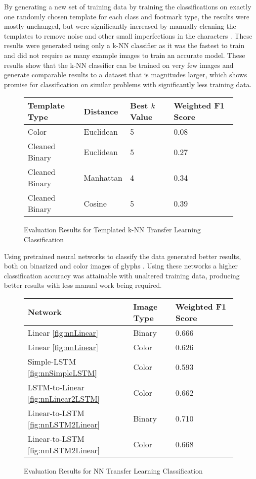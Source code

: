 By generating a new set of training data by training the classifications on exactly one randomly chosen template for each class and footmark type, the results were mostly unchanged, but were significantly increased by manually cleaning the templates to remove noise and other small imperfections in the characters . These results were generated using only a k-NN classifier as it was the fastest to train and did not require as many example images to train an accurate model. These results show that the k-NN classifier can be trained on very few images and generate comparable results to a dataset that is magnitudes larger, which shows promise for classification on similar problems with significantly less training data.

\begin{figure}[H]
    \caption{Evaluation Results for Templated k-NN Transfer Learning Classification}
    \label{fig:classificationKNNTemplates}
    \centering
    \begin{tabular}{ | l | l | l | l | }
        \hline
        Template Type & Distance & Best $k$ Value & Weighted F1 Score \\
        \hline
        Color & Euclidean & 5 & 0.08 \\
        Cleaned Binary & Euclidean & 5 & 0.27 \\
        Cleaned Binary & Manhattan & 4 & 0.34 \\
        Cleaned Binary & Cosine & 5 & 0.39 \\
        \hline
    \end{tabular}
\end{figure}

Using pretrained neural networks to classify the data generated better results, both on binarized and color images of glyphs . Using these networks a higher classification accuracy was attainable with unaltered training data, producing better results with less manual work being required.

\begin{figure}[H]
    \caption{Evaluation Results for NN Transfer Learning Classification}
    \label{fig:classificationFeatureVectorNN}
    \centering
    \begin{tabular}{ | l | l | l | }
        \hline
        Network & Image Type & Weighted F1 Score \\
        \hline
        Linear \ref{fig:nnLinear} & Binary & 0.666 \\
        Linear \ref{fig:nnLinear} & Color & 0.626 \\
        Simple-LSTM \ref{fig:nnSimpleLSTM} & Color & 0.593 \\
        LSTM-to-Linear \ref{fig:nnLinear2LSTM} & Color & 0.662 \\
        Linear-to-LSTM \ref{fig:nnLSTM2Linear} & Binary & 0.710 \\
        Linear-to-LSTM \ref{fig:nnLSTM2Linear} & Color & 0.668 \\
        \hline
    \end{tabular}
\end{figure}

